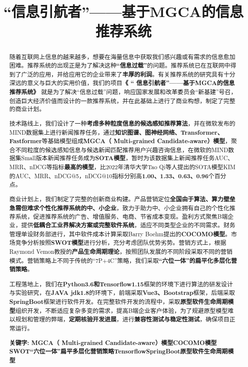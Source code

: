 \documentclass[withoutpreface,bwprint]{cumcmthesis} %
\title{“信息引航者”——基于MGCA的信息推荐系统}
\begin{document}
	
	\maketitle\thispagestyle{empty}
	\begin{abstract}
		随着互联网上信息的越来越多，想要在海量信息中获取我们感兴趣或有需求的信息愈加困难。推荐系统的出现正是为了解决这种\textbf{“信息过载”}的问题。推荐系统已在互联网中得到了广泛的应用，并给应用它的企业带来了\textbf{丰厚的利润}。有关推荐系统的研究具有十分深远的意义与巨大的实用价值，我们的项目\textbf{《 “ 信息引航者”——基于MGCA的信息推荐系统》 }就是为了解决“信息过载”问题，响应国家发展和改革委员会“新基建”号召，创造巨大经济价值而设计的一款推荐系统，并在此基础上进行了商业构想，制定了完整的商业计划。\par
		技术路线上，我们设计了一种\textbf{考虑多种粒度信息的候选感知推荐算法}，并在微软发布的MIND数据集上进行新闻推荐任务，通过\textbf{知识图谱、图神经网络、Transformer、Fastformer}等基础模型组成\textbf{MGCA（ Multi-grained Candidate-aware）模型}，聚合不同粒度的候选感知信息与候选新闻匹配推荐用户兴趣咨询信息，在微软的MIND数据集Small版本新闻推荐任务成为\textbf{SOTA模型}，暂时为该数据集上新闻推荐任务AUC、MRR、nDCG等指标\textbf{最高的模型}，比2022年清华大学Tao Qi等人提出的SOTA模型KIM的AUC、MRR、nDCG@5，nDCG@10指标分别高\textbf{1.00、1.33、0.63、0.96}个百分点。\par
		商业计划上，我们制定了完整的创新商业构建。产品营销定位\textbf{全国由于算法、算力壁垒急需但难求个性化推荐系统的中、小企业}，致力于助力中、小企业拥有自己的个性化推荐系统，促进推荐系统的广告、增值服务、电商、节省成本变现。盈利方式聚焦B端企业，提供\textbf{低耦合工业界解决方案或完整软件系统}，适应不同类型企业的不同需求。财务管理单设财务部进行，其中软件成本计算采取Barry Boehm提出的\textbf{COCOMO模型}。市场竞争分析按照\textbf{SWOT模型}进行分析，充分考虑团队优势劣势。营销方式上，根据Raymond Vemon教授的\textbf{产品生命周期理论}，按照团队发展的不同阶段采取不同的营销模式。营销策略上不同于传统的“7P+4C”策略，我们采取\textbf{“六位一体”的扁平化多层化营销策略}。\par
		工程落地上，我们在\textbf{Python3.6和Tensorflow1.15}框架的环境下进行算法的研发设计与实验研究，在\textbf{JAVA jdk1.8}的环境下，前端采取\textbf{Vue3、Bootstrap}框架，后端采取\textbf{SpringBoot}框架进行软件开发。在完整软件开发的流程中，采取\textbf{原型软件生命周期模型}组织开发，不断适应复杂多变的需求，提高B端企业客户体验，为了规避原型模型难以规划和管理的弊端，\textbf{定期核验开发进展}，进行\textbf{兼容性测试与稳定性测试}，确保项目正常运行。\par
		\textbf	{关键字: MGCA（ Multi-grained Candidate-aware）模型\quad  COCOMO模型\quad  SWOT\quad  “六位一体”扁平多层化营销策略\quad   Tensorflow\quad SpringBoot\quad  原型软件生命周期模型\quad	}
	\end{abstract}
	\setcounter{page}{1}
	\tableofcontents
	\newpage
\end{document}
